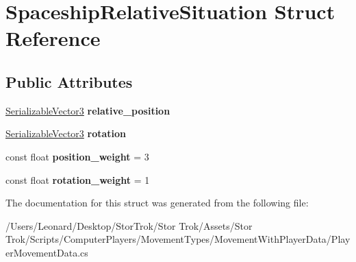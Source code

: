 \hypertarget{struct_spaceship_relative_situation}{}\section{Spaceship\+Relative\+Situation Struct Reference}
\label{struct_spaceship_relative_situation}
\subsection*{Public Attributes}
\begin{DoxyCompactItemize}
\item 
\mbox{\label{struct_spaceship_relative_situation_a0a2ad90d6b19cbf88ce4f989a41bd616}} 
\hyperlink{class_serializable_vector3}{Serializable\+Vector3} {\bfseries relative\+\_\+position}
\item 
\mbox{\label{struct_spaceship_relative_situation_ae2c0257089a0ebfab52ef16e91876e58}} 
\hyperlink{class_serializable_vector3}{Serializable\+Vector3} {\bfseries rotation}
\item 
\mbox{\label{struct_spaceship_relative_situation_ab35671cd6172cb06ed4113567bbf5e3f}} 
const float {\bfseries position\+\_\+weight} = 3
\item 
\mbox{\label{struct_spaceship_relative_situation_a8c6b548a707f9b579e4d7304d7a3c259}} 
const float {\bfseries rotation\+\_\+weight} = 1
\end{DoxyCompactItemize}


The documentation for this struct was generated from the following file\+:\begin{DoxyCompactItemize}
\item 
/\+Users/\+Leonard/\+Desktop/\+Stor\+Trok/\+Stor Trok/\+Assets/\+Stor Trok/\+Scripts/\+Computer\+Players/\+Movement\+Types/\+Movement\+With\+Player\+Data/Player\+Movement\+Data.\+cs\end{DoxyCompactItemize}
